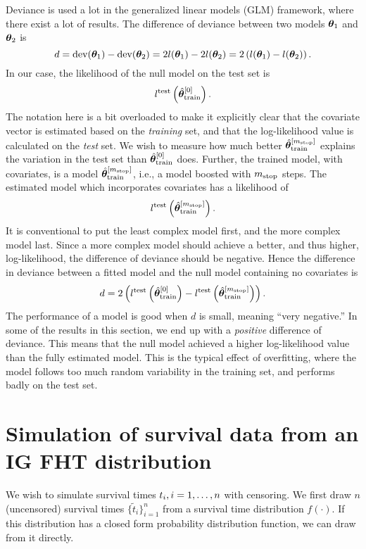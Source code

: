 Deviance is used a lot in the generalized linear models (GLM) framework, where there exist a lot of results.
The difference of deviance between two models $\boldsymbol{\theta}_1$ and $\boldsymbol{\theta}_2$ is
\begin{equation}
    d=\text{dev}(\boldsymbol{\theta}_1)-\text{dev}(\boldsymbol{\theta}_2)=2l(\boldsymbol{\theta}_1)-2l(\boldsymbol{\theta}_2)=2\left(l(\boldsymbol{\theta}_1)-l(\boldsymbol{\theta}_2)\right).
\end{equation}
In our case, the likelihood of the null model on the test set is
\begin{equation}
    l^{\text{test}}\left(\hat{\boldsymbol{\theta}}^{[0]}_{\text{train}}\right).
\end{equation}
The notation here is a bit overloaded to make it explicitly clear that the covariate vector is estimated based on the \textit{training} set, and that the log-likelihood value is calculated on the \textit{test} set.
We wish to measure how much better $\hat{\boldsymbol{\theta}}_{\text{train}}^{[m_{\text{stop}}]}$ explains the variation in the test set than $\hat{\boldsymbol{\theta}}_{\text{train}}^{[0]}$ does.
Further, the trained model, with covariates, is a model $\hat{\boldsymbol{\theta}}^{[m_{\text{stop}}]}_{\text{train}}$, i.e., a model boosted with $m_{\text{stop}}$ steps.
The estimated model which incorporates covariates has a likelihood of
\begin{equation}
    l^{\text{test}}\left(\hat{\boldsymbol{\theta}}^{[m_{\text{stop}}]}_{\text{train}}\right).
\end{equation}
It is conventional to put the least complex model first, and the more complex model last.
Since a more complex model should achieve a better, and thus higher, log-likelihood, the difference of deviance should be negative. 
Hence the difference in deviance between a fitted model and the null model containing no covariates is
\begin{equation*}
    d=2\left(l^{\text{test}}\left(\hat{\boldsymbol{\theta}}^{[0]}_{\text{train}}\right)-l^{\text{test}}\left(\hat{\boldsymbol{\theta}}^{[m_{\text{stop}}]}_{\text{train}}\right)\right).
\end{equation*}
The performance of a model is good when $d$ is small, meaning ``very negative.''
In some of the results in this section, we end up with a \textit{positive} difference of deviance.
This means that the null model achieved a higher log-likelihood value than the fully estimated model.
This is the typical effect of overfitting, where the model follows too much random variability in the training set, and performs badly on the test set.

\section{Simulation of survival data from an IG FHT distribution}\label{sec:simulate-IG-data}
We wish to simulate survival times $t_{i},i=1,\ldots,n$ with censoring.
We first draw $n$ (uncensored) survival times $\{\tilde{t}_i\}_{i=1}^n$ from a survival time distribution $f(\cdot)$.
If this distribution has a closed form probability distribution function, we can draw from it directly.


